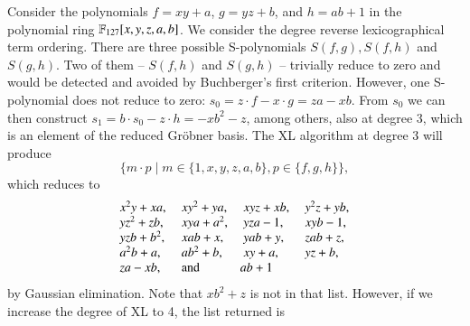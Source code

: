 \begin{example} Consider the polynomials $f = xy + a$, $g = yz + b$, and $h = ab + 1$ in the polynomial ring ${\mathbb F}_{127}[x,y,z,a,b]$. We consider the degree reverse lexicographical term ordering.
There are three possible S-polynomials $S(f,g),S(f,h)$ and $S(g,h)$. Two of them -- $S(f,h)$ and $S(g,h)$ -- trivially reduce to zero and would be detected and avoided by Buchberger's first criterion. However, one S-polynomial does not reduce to zero: $s_0 = z\cdot f - x\cdot g = za - xb$.
From $s_0$ we can then construct $s_1 = b\cdot s_0 - z\cdot h = -xb^2 - z$, among others, also at degree 3, which is an element of the reduced Gr\"obner basis. The XL algorithm at degree 3 will produce $$\{m\cdot p \mid m \in \{1,x,y,z,a,b\}, p \in \{f,g,h\}\},$$ which reduces to 
\[
\begin{array}{llll}
 x^{2} y + x a, &\ x y^{2} + y a, &\  x y z + x b,  &\  y^{2} z + y b, \\ 
 y z^{2} + z b, &\ x y a + a^{2}, &\  y z a - 1,    &\  x y b - 1,     \\
 y z b + b^{2}, &\ x a b + x,     &\  y a b + y,    &\  z a b + z,     \\
 a^{2} b + a,   &\ a b^{2} + b,   &\  x y + a,      &\  y z + b,       \\
 z a - x b,     & \textnormal{ and } & a b + 1 &\\
\end{array}
\]
by Gaussian elimination. Note that $xb^2 + z$ is not in that list. However, if we increase the degree of XL to 4, the list returned is 
\[
\begin{array}{llll}


\end{array}\]
\end{example}
